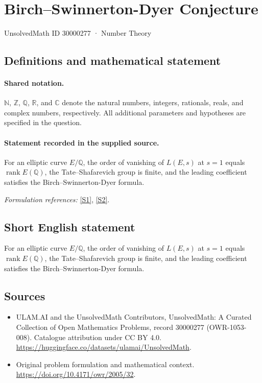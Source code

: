 \documentclass[11pt]{article}
\newcommand{\sref}[2]{\hyperlink{source:#1:#2}{[S#2]}}
\begin{document}
\setcounter{section}{30000276}
\section{Birch–Swinnerton-Dyer Conjecture}\label{30000277}
{\small UnsolvedMath ID 30000277 · Number Theory}
\subsection{Definitions and mathematical statement}

\paragraph{Shared notation.}$\mathbb N$, $\mathbb Z$, $\mathbb Q$, $\mathbb R$, and $\mathbb C$ denote the natural numbers, integers, rationals, reals, and complex numbers, respectively. All additional parameters and hypotheses are specified in the question.


\paragraph{Statement recorded in the supplied source.}
For an elliptic curve $E/\mathbb Q$, the order of vanishing of $L(E,s)$ at $s=1$ equals $\operatorname{rank}E(\mathbb Q)$, the Tate–Shafarevich group is finite, and the leading coefficient satisfies the Birch–Swinnerton-Dyer formula.
\par\smallskip\textit{Formulation references:} \sref{30000277}{1}, \sref{30000277}{2}.
\subsection{Short English statement}
For an elliptic curve $E/\mathbb Q$, the order of vanishing of $L(E,s)$ at $s=1$ equals $\operatorname{rank}E(\mathbb Q)$, the Tate–Shafarevich group is finite, and the leading coefficient satisfies the Birch–Swinnerton-Dyer formula.
\subsection{Sources}
\begin{itemize}
\item[\hypertarget{source:30000277:1}{S1}] ULAM.AI and the UnsolvedMath Contributors, UnsolvedMath: A Curated Collection of Open Mathematics Problems, record 30000277 (OWR-1053-008). Catalogue attribution under CC BY 4.0.
\url{https://huggingface.co/datasets/ulamai/UnsolvedMath}.
\item[\hypertarget{source:30000277:2}{S2}] Original problem formulation and mathematical context.
\url{https://doi.org/10.4171/owr/2005/32}.
\end{itemize}
\label{end:30000277}
\end{document}
